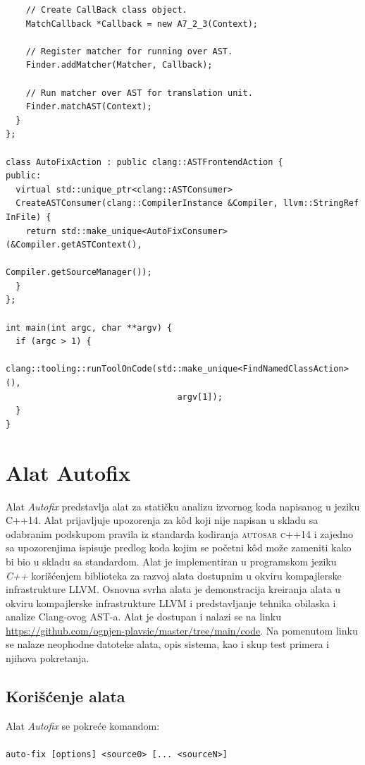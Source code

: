 \documentclass[12pt,oneside]{memoir}
\begin{document}
\begin{lstlisting}
    // Create CallBack class object.
    MatchCallback *Callback = new A7_2_3(Context);

    // Register matcher for running over AST.
    Finder.addMatcher(Matcher, Callback);

    // Run matcher over AST for translation unit.
    Finder.matchAST(Context);
  }
};

class AutoFixAction : public clang::ASTFrontendAction {
public:
  virtual std::unique_ptr<clang::ASTConsumer>
  CreateASTConsumer(clang::CompilerInstance &Compiler, llvm::StringRef InFile) {
    return std::make_unique<AutoFixConsumer>(&Compiler.getASTContext(),
                                             Compiler.getSourceManager());
  }
};

int main(int argc, char **argv) {
  if (argc > 1) {
    clang::tooling::runToolOnCode(std::make_unique<FindNamedClassAction>(),
                                  argv[1]);
  }
}
\end{lstlisting}


\chapter{Alat Autofix}
\label{chp:autofix}

Alat \textit{Autofix} predstavlja alat za stati\v{c}ku analizu izvornog koda napisanog u jeziku C++14. Alat prijavljuje upozorenja
za k\^{o}d koji nije napisan u skladu sa odabranim podskupom pravila iz standarda kodiranja \textsc{autosar c++14} i zajedno sa upozorenjima
ispisuje predlog koda kojim se po\v{c}etni k\^{o}d mo\v{z}e zameniti kako bi bio u skladu sa standardom.
Alat je implementiran u programskom jeziku \textit{C++} kori\v{s}\'{c}enjem biblioteka za razvoj alata dostupnim u okviru kompajlerske infrastrukture LLVM.
Osnovna svrha alata je demonstracija kreiranja alata u okviru kompajlerske infrastrukture LLVM i predstavljanje tehnika obilaska i analize Clang-ovog AST-a. 
Alat je dostupan i nalazi se na linku \url{https://github.com/ognjen-plavsic/master/tree/main/code}. Na pomenutom linku se nalaze neophodne datoteke alata, opis
sistema, kao i skup test primera i njihova pokretanja.

\section{Kori\v{s}\'{c}enje alata}

Alat \textit{Autofix} se pokre\'{c}e komandom:
\\ \\
 \indent \indent \texttt{auto-fix [options] <source0> [... <sourceN>]}
\\ 
\end{document}
